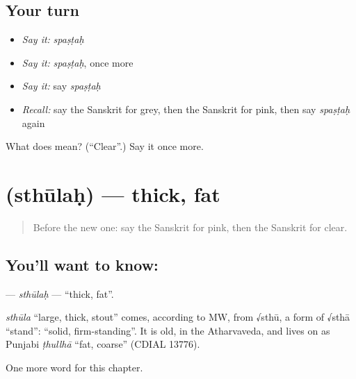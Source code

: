 \subsection*{Your turn}
\begin{itemize}
\raggedright
  \item \emph{Say it:} \emph{spaṣṭaḥ}
  \item \emph{Say it:} \emph{spaṣṭaḥ}, once more
  \item \emph{Say it:} say \emph{spaṣṭaḥ}
  \item \emph{Recall:} say the Sanskrit for grey, then the Sanskrit for pink, then say \emph{spaṣṭaḥ} again
\end{itemize}

\begin{tcolorbox}[breakable,colback=teal!4,colframe=teal!35!black,title={Before you move on}]
What does  mean? (\textquotedblleft{}Clear\textquotedblright{}.) Say it once more.
\end{tcolorbox}
\section[\texorpdfstring{\sk{स्थूलः} (sthūlaḥ)}{स्थूलः (sthūlaḥ)}]{ (sthūlaḥ) — thick, fat}

\label{lesson:SA-C131-sthulah}



\begin{quote}
Before the new one: say the Sanskrit for pink, then the Sanskrit for clear.
\end{quote}

\subsection*{You'll want to know: }
\textbf{} — \emph{sthūlaḥ} — \textquotedblleft{}thick, fat\textquotedblright{}.

\begin{cousinweb}
\emph{sthūla} \textquotedblleft{}large, thick, stout\textquotedblright{} comes, according to MW, from √sthū, a form of √sthā \textquotedblleft{}stand\textquotedblright{}: \textquotedblleft{}solid, firm-standing\textquotedblright{}. It is old, in the Atharvaveda, and lives on as Punjabi \emph{ṭhullhā} \textquotedblleft{}fat, coarse\textquotedblright{} (CDIAL 13776).
\end{cousinweb}

\begin{grammarlens}[title={What you've built}]
One more word for this chapter.
\end{grammarlens}

